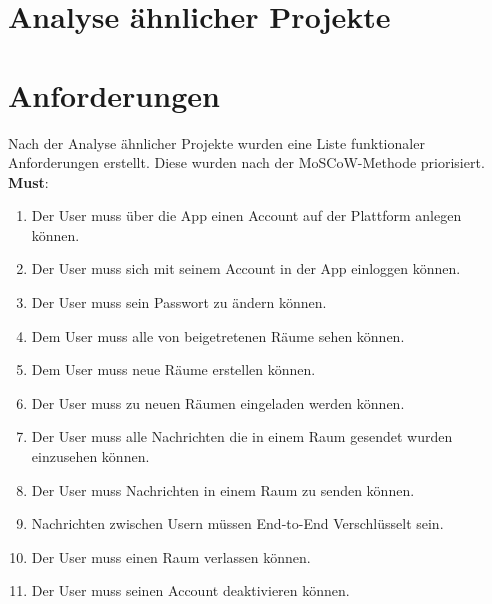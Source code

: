     \section{Analyse ähnlicher Projekte}\label{sec:analyse-ahnlicher-projekte}



    \newpage
    \section{Anforderungen}\label{sec:anforderungsliste}
    Nach der Analyse ähnlicher Projekte wurden eine Liste funktionaler Anforderungen erstellt.
    Diese wurden nach der MoSCoW-Methode priorisiert.\\

    \textbf{Must}:
    \begin{enumerate}[label={\roman*.}, leftmargin=2.5cm]
        \item Der User muss über die App einen Account auf der Plattform anlegen können.
        \item Der User muss sich mit seinem Account in der App einloggen können.
        \item Der User muss sein Passwort zu ändern können.
        \item Dem User muss alle von beigetretenen Räume sehen können.
        \item Dem User muss neue Räume erstellen können.
        \item Der User muss zu neuen Räumen eingeladen werden können.
        \item Der User muss alle Nachrichten die in einem Raum gesendet wurden einzusehen können.
        \item Der User muss Nachrichten in einem Raum zu senden können.
        \item Nachrichten zwischen Usern müssen End-to-End Verschlüsselt sein.
        \item Der User muss einen Raum verlassen können.
        \item Der User muss seinen Account deaktivieren können.
    \end{enumerate}


